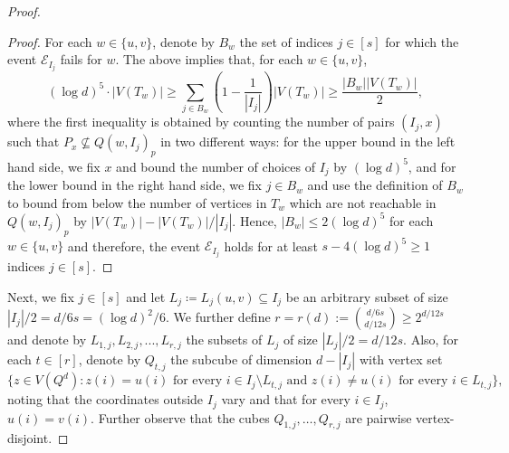\documentclass[reqno,final,a4paper]{amsart}
\theoremstyle{definition}
\newcommand{\cE}{\mathcal{E}}
\newcommand{\1}{\mathbbm{1}}
\begin{document}
\begin{proof}
\begin{proof}
For each $w\in \{u,v\}$, denote by $B_w$ the set of indices $j\in [s]$ for which the event $\cE_{I_j}$ fails for $w$. The above implies that, for each $w\in \{u,v\}$,
\[ (\log d)^5 \cdot |V(T_w)|  \ge \sum_{j\in B_w} \left(1-\frac{1}{|I_j|}\right)|V(T_w)|\ge \frac{|B_w||V(T_w)|}{2},\]
where the first inequality is obtained by counting the number of pairs $(I_j,x)$ such that $P_x\not\subseteq Q(w,I_j)_p$ in two different ways: for the upper bound in the left hand side, we fix $x$ and bound the number of choices of $I_j$ by $(\log d)^5$, and for the lower bound in the right hand side, we fix $j\in B_w$ and use the definition of $B_w$ to bound from below the number of vertices in $T_w$ which are not reachable in $Q(w,I_j)_p$ by $|V(T_w)|-|V(T_w)|/|I_j|$.
Hence, $|B_w|\leq 2(\log d)^5$ for each $w\in \{u,v\}$ and therefore, the event $\mathcal{E}_{I_j}$ holds for at least $s-4(\log d)^5\ge 1$ indices $j\in [s]$.    
\end{proof}

Next, we fix $j\in [s]$ and let $L_j\coloneqq L_j(u,v)\subseteq I_j$ be an arbitrary subset of size $|I_j|/2=d/6s=(\log d)^2/6$.
We further define $r=r(d):= \binom{d/6s}{d/12s}\ge 2^{d/12s}$ and denote by $L_{1,j},L_{2,j},...,L_{r,j}$ the subsets of $L_j$ of size $|L_j|/2=d/12s$. 
Also, for each $t\in [r]$, denote by $Q_{t,j}$ the subcube of dimension $d-|I_j|$ with vertex set 
\[\{z\in V(Q^d): z(i)=u(i) \text{ for every }i\in I_j\setminus L_{t,j} \text{ and } z(i)\neq u(i) \text{ for every } i\in L_{t,j}\},\]
noting that the coordinates outside $I_j$ vary and that for every $i\in I_j$, $u(i)=v(i)$. Further observe that the cubes $Q_{1,j},\ldots,Q_{r,j}$ are pairwise vertex-disjoint.


\end{proof}
\end{document}
